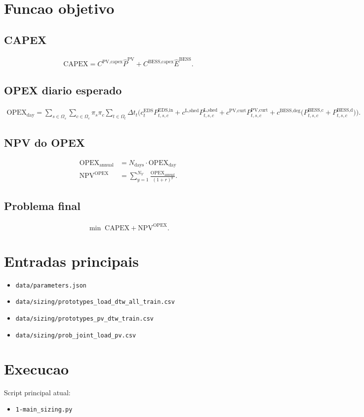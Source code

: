\documentclass[11pt,a4paper]{article}
\begin{document}
\section{Funcao objetivo}
\subsection*{CAPEX}
\begin{align}
\text{CAPEX} =
C^{\text{PV,capex}}\hat{P}^{\text{PV}} +
C^{\text{BESS,capex}}\hat{E}^{\text{BESS}}.
\end{align}

\subsection*{OPEX diario esperado}
\begin{align}
\text{OPEX}_{\text{day}} =
\sum_{s \in \Omega_s}\sum_{c \in \Omega_c}\pi_s\pi_c
\sum_{t \in \Omega_t}\Delta t_t \Big(
c_t^{\text{EDS}}P_{t,s,c}^{\text{EDS,in}}
+ c^{\text{L,shed}}P_{t,s,c}^{\text{L,shed}}
+ c^{\text{PV,curt}}P_{t,s,c}^{\text{PV,curt}}
+ c^{\text{BESS,deg}}\big(P_{t,s,c}^{\text{BESS,c}} + P_{t,s,c}^{\text{BESS,d}}\big)
\Big).
\end{align}

\subsection*{NPV do OPEX}
\begin{align}
\text{OPEX}_{\text{annual}} &= N_{\text{days}}\cdot\text{OPEX}_{\text{day}}\\
\text{NPV}^{\text{OPEX}} &= \sum_{y=1}^{N_Y}\frac{\text{OPEX}_{\text{annual}}}{(1+r)^y}.
\end{align}

\subsection*{Problema final}
\begin{align}
\min\; \text{CAPEX} + \text{NPV}^{\text{OPEX}}.
\end{align}

\section{Entradas principais}
\begin{itemize}
\item \texttt{data/parameters.json}
\item \texttt{data/sizing/prototypes\_load\_dtw\_all\_train.csv}
\item \texttt{data/sizing/prototypes\_pv\_dtw\_train.csv}
\item \texttt{data/sizing/prob\_joint\_load\_pv.csv}
\end{itemize}

\section{Execucao}
Script principal atual:
\begin{itemize}
\item \texttt{1-main\_sizing.py}
\end{itemize}
\end{document}
